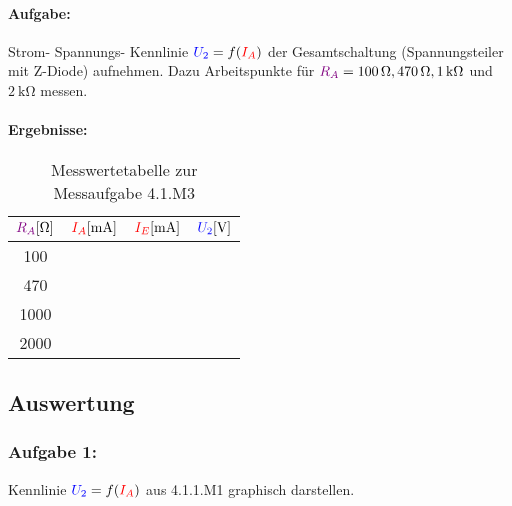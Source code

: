 \documentclass[11pt,a4paper,titlepage,parskip=half]{scrreprt}
\begin{document}
              \paragraph{Aufgabe:} Strom- Spannungs- Kennlinie $\textcolor{blue}{U_2}= f(\textcolor{red}{I_A})$ der Gesamtschaltung (Spannungsteiler mit Z-Diode) aufnehmen. Dazu Arbeitspunkte für $\textcolor{violet}{R_A} = \SI{100}{\ohm}, \SI{470}{\ohm}, \SI{1}{\kilo\ohm}$ und $\SI{2}{\kilo\ohm}$ messen.
              \paragraph{Ergebnisse:}
              \begin{center}
                  \begin{table}[!hbtp]
                      \caption{Messwertetabelle zur Messaufgabe 4.1.M3}
                      \label{tbl:messergebnisse4.1}
                      \renewcommand{\arraystretch}{1.3}
                      \begin{center}
                          \begin{tabular}{c|c|c|c}
                              $\textcolor{violet}{R_A} [\si{\ohm}]$&
                              $\textcolor{red}{I_A} [\si{\milli\ampere}]$&
                              $\textcolor{red}{I_E} [\si{\milli\ampere}]$&
                              $\textcolor{blue}{U_2} [\si{\volt}]$\\ \hline

                              100 & \qquad\qquad\qquad & \qquad\qquad\qquad & \qquad\qquad\qquad\\\hline
                              470 &  & & \\\hline
                              1000 &  &  &\\\hline
                              2000 &  &  & \\
                          \end{tabular}
                      \end{center}
                  \end{table}
                  \end{center}

          \subsection{Auswertung}
            \subsubsection{Aufgabe 1:} Kennlinie $\textcolor{blue}{U_2} = f(\textcolor{red}{I_A})$ aus 4.1.1.M1 graphisch darstellen.
\end{document}
